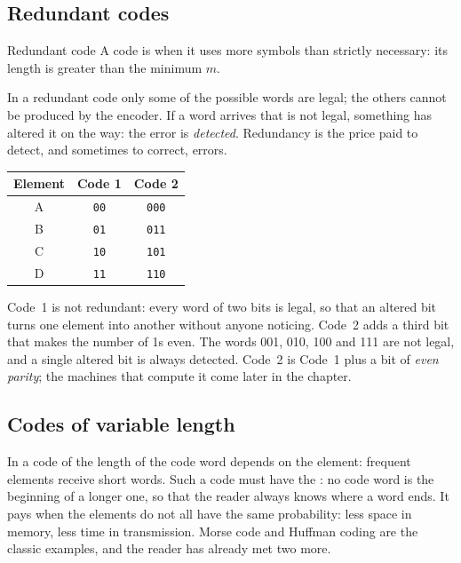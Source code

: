 \subsection{Redundant codes}

\begin{definition}{Redundant code}
A code is  when it uses more symbols than strictly necessary:
its length is greater than the minimum $m$.
\end{definition}

In a redundant code only some of the possible words are legal; the others
cannot be produced by the encoder. If a word arrives that is not legal,
something has altered it on the way: the error is \emph{detected}.
Redundancy is the price paid to detect, and sometimes to correct, errors.

\begin{center}\small
\begin{tabular}{@{}ccc@{}}
\toprule
\textbf{Element} & \textbf{Code 1} & \textbf{Code 2}\\
\midrule
A & \texttt{00} & \texttt{000}\\
B & \texttt{01} & \texttt{011}\\
C & \texttt{10} & \texttt{101}\\
D & \texttt{11} & \texttt{110}\\
\bottomrule
\end{tabular}
\end{center}

Code~1 is not redundant: every word of two bits is legal, so that an altered
bit turns one element into another without anyone noticing. Code~2 adds a
third bit that makes the number of 1s even. The words 001, 010, 100 and 111
are not legal, and a single altered bit is always detected. Code~2 is Code~1
plus a bit of \emph{even parity}; the machines that compute it come later in
the chapter.

\subsection{Codes of variable length}

In a code of  the length of the code word depends on the
element: frequent elements receive short words. Such a code must have the
: no code word is the beginning of a longer one, so that
the reader always knows where a word ends. It pays when the elements do not
all have the same probability: less space in memory, less time in
transmission. Morse code and Huffman coding are the classic examples, and the
reader has already met two more.

